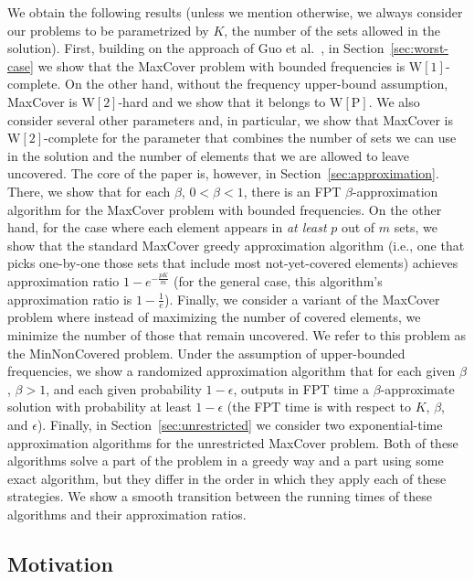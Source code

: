 \documentclass[11pt]{article}
\newcommand{\wone}{{\mathrm{W[1]}}}
\newcommand{\wtwo}{{\mathrm{W[2]}}}
\newcommand{\wpclass}{{\mathrm{W[P]}}}
\begin{document}
We obtain the following results (unless we mention otherwise, we
always consider our problems to be parametrized by $K$, the number of
the sets allowed in the solution).  First, building on the approach of
Guo et al.~\cite{guo-nie-wer:j:vertex-cover-variants}, in
Section~\ref{sec:worst-case} we show that the MaxCover problem with
bounded frequencies is $\wone$-complete.
On the other hand, without the frequency upper-bound assumption,
MaxCover is $\wtwo$-hard and we show that it belongs to $\wpclass$. We
also consider several other parameters and, in particular, we show
that MaxCover is $\wtwo$-complete for the parameter that combines the
number of sets we can use in the solution and the number of elements
that we are allowed to leave uncovered.  The core of the paper is,
however, in Section~\ref{sec:approximation}.  There, we show that for
each $\beta$, $0 < \beta < 1$, there is an FPT $\beta$-approximation
algorithm for the MaxCover problem with bounded frequencies.  On the
other hand, for the case where each element appears in \emph{at least}
$p$ out of $m$ sets, we show that the standard MaxCover greedy
approximation algorithm (i.e., one that picks one-by-one those sets
that include most not-yet-covered elements) achieves approximation
ratio $1-e^{-\frac{pK}{m}}$ (for the general case, this algorithm's
approximation ratio is $1-\frac{1}{e}$). Finally, we consider a
variant of the MaxCover problem where instead of maximizing the number
of covered elements, we minimize the number of those that remain
uncovered. We refer to this problem as the MinNonCovered problem.
Under the assumption of upper-bounded frequencies, we show a
randomized approximation algorithm that for each given $\beta$, $\beta
> 1$, and each given probability $1-\epsilon$, outputs in FPT time a
$\beta$-approximate solution with probability at least $1-\epsilon$
(the FPT time is with respect to $K$, $\beta$, and $\epsilon$).
Finally, in Section~\ref{sec:unrestricted} we consider two
exponential-time approximation algorithms for the unrestricted
MaxCover problem. Both of these algorithms solve a part of the problem
in a greedy way and a part using some exact algorithm, but they differ
in the order in which they apply each of these strategies. We show a
smooth transition between the running times of these algorithms and their
approximation ratios.



\subsection{Motivation}
\end{document}
